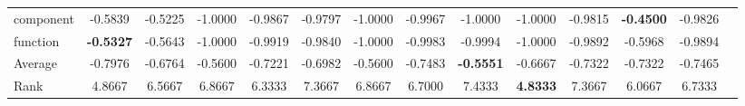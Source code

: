 \begin{threeparttable}
\begin{tabular}{lccccccccccccc}
component &-0.5839 &-0.5225 &-1.0000 &-0.9867 &-0.9797 &-1.0000 &-0.9967 &-1.0000 &-1.0000 &-0.9815 &\textbf{-0.4500} &-0.9826 &  \\
function &\textbf{-0.5327} &-0.5643 &-1.0000 &-0.9919 &-0.9840 &-1.0000 &-0.9983 &-0.9994 &-1.0000 &-0.9892 &-0.5968 &-0.9894 &  \\
\hline
Average &-0.7976 &-0.6764 &-0.5600 &-0.7221 &-0.6982 &-0.5600 &-0.7483 &\textbf{-0.5551} &-0.6667 &-0.7322 &-0.7322 &-0.7465 &  \\
Rank &4.8667 &6.5667 &6.8667 &6.3333 &7.3667 &6.8667 &6.7000 &7.4333 &\textbf{4.8333} &7.3667 &6.0667 &6.7333 &  \\
\bottomrule
\end{tabular}
\end{threeparttable}